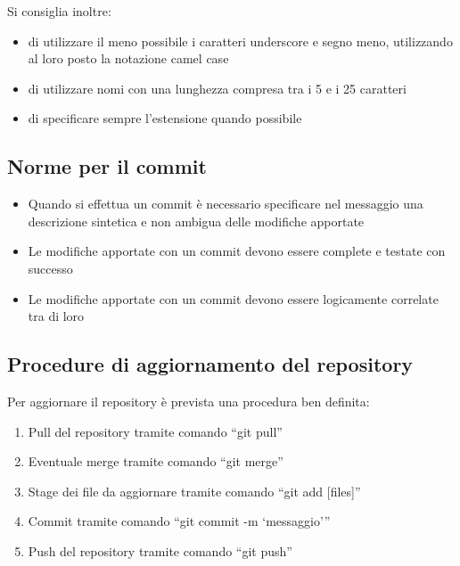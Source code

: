 Si consiglia inoltre:
\begin{itemize}
\item di utilizzare il meno possibile i caratteri underscore e segno meno, utilizzando al loro posto la notazione camel case
\item di utilizzare nomi con una lunghezza compresa tra i 5 e i 25 caratteri
\item di specificare sempre l’estensione quando possibile
\end{itemize}

\subsection{Norme per il commit}
\begin{itemize}
\item Quando si effettua un commit è necessario specificare nel messaggio una descrizione sintetica e non ambigua delle modifiche apportate
\item Le modifiche apportate con un commit devono essere complete e testate con successo
\item Le modifiche apportate con un commit devono essere logicamente correlate tra di loro
\end{itemize}

\subsection{Procedure di aggiornamento del repository}
Per aggiornare il repository è prevista una procedura ben definita:
\begin{enumerate}
\item Pull del repository tramite comando “git pull”
\item Eventuale merge tramite comando “git merge”
\item Stage dei file da aggiornare tramite comando “git add [files]”
\item Commit tramite comando “git commit -m ‘messaggio’”
\item Push del repository tramite comando “git push”
\end{enumerate}
